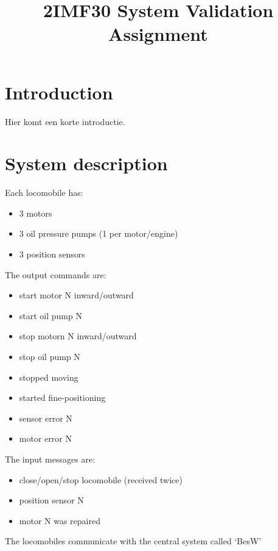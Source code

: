 \documentclass{article}
\title{2IMF30 System Validation Assignment}
\begin{document}
\section{Introduction}
Hier komt een korte introductie.


\section{System description}
Each locomobile has:
\begin{itemize}
    \item 3 motors
    \item 3 oil pressure pumps (1 per motor/engine)
    \item 3 position sensors
\end{itemize}
The output commands are:
\begin{itemize}
    \item start motor N inward/outward
    \item start oil pump N
    \item stop motorn N inward/outward
    \item stop oil pump N

    \item stopped moving
    \item started fine-positioning
    \item sensor error N
    \item motor error N
\end{itemize}
The input messages are:
\begin{itemize}
    \item close/open/stop locomobile (received twice)
    \item position sensor N
    \item motor N was repaired
\end{itemize}

The locomobiles communicate with the central system called `BesW'
\end{document}
